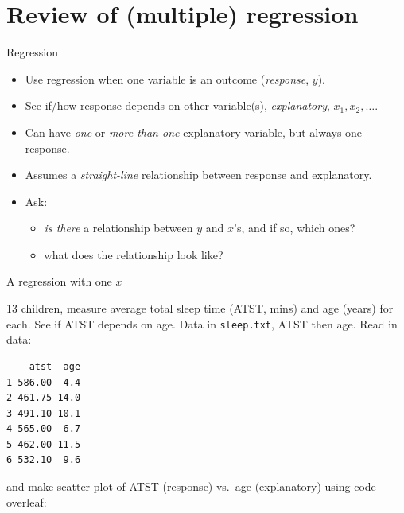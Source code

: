 
\section{Review of (multiple) regression}
\frame{\sectionpage}




\begin{frame}{Regression}

  \begin{itemize}
  \item Use regression when one variable is an outcome ({\em response}, $y$).
  \item See if/how response depends on other variable(s), {\em explanatory}, $x_1, x_2,\ldots$.
  \item Can have {\em one} or {\em more than one} explanatory variable, but always one response.
  \item Assumes a {\em straight-line} relationship between response and explanatory.
  \item Ask: 
    \begin{itemize}
    \item {\em is there} a relationship between $y$ and $x$'s, and if so, which ones?
    \item what does the relationship look like?
    \end{itemize}

  \end{itemize}
  
\end{frame}

\begin{frame}[fragile]{A regression with one $x$}

13 children, measure average total sleep time (ATST, mins) and age (years) for each. See if ATST depends on age. Data in \verb-sleep.txt-, ATST then age. Read in data:

 
\begin{knitrout}
\color{fgcolor}\begin{kframe}
\begin{alltt}
\hlkwb{=}\hlstd{(}\hlstd{,}
\end{alltt}
\begin{verbatim}
    atst  age
1 586.00  4.4
2 461.75 14.0
3 491.10 10.1
4 565.00  6.7
5 462.00 11.5
6 532.10  9.6
\end{verbatim}
\end{kframe}
\end{knitrout}

and make scatter plot of ATST (response) vs.\ age (explanatory) using
code overleaf:

 


\end{frame}




